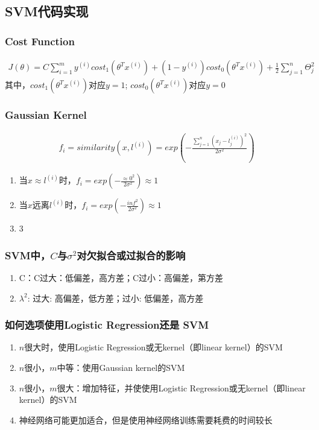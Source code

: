 \subsection{SVM代码实现}
\subsubsection{Cost Function}
\begin{equation}\begin{aligned}
	J(\theta) = C\sum_{i=1}^m y^{(i)}cost_1(\theta^Tx^{(i)}) + (1-y^{(i)})cost_0(\theta^Tx^{(i)}) + \frac{1}{2}\sum_{j=1}^n\Theta_j^2
\end{aligned}\end{equation}
其中，$cost_1(\theta^Tx^{(i)})$对应$y=1$; $cost_0(\theta^Tx^{(i)})$对应$y=0$


\subsubsection{Gaussian Kernel}
\begin{equation}\begin{aligned}
	f_i = similarity(x, l^{(i)}) = exp(-\frac{\sum_{j=1}^n(x_j - l_j^{(i)})^2}{2\sigma^2})
\end{aligned}\end{equation}
\begin{enumerate}
	\item 当$x \approx l^{(i)}$时，$f_i=exp(-\frac{\approx 0^2}{2\sigma^2}) \approx 1$
	\item 当$x$远离$l^{(i)}$时，$f_i=exp(-\frac{inf^2}{2\sigma^2}) \approx 1$
	\item 3
\end{enumerate}


\subsubsection{SVM中，$C$与$\sigma^2$对欠拟合或过拟合的影响}
\begin{enumerate}
	\item C：C过大：低偏差，高方差；C过小：高偏差，第方差
	\item $\lambda^2$: 过大: 高偏差，低方差；过小: 低偏差，高方差
\end{enumerate}


\subsubsection{如何选项使用Logistic Regression还是 SVM}
\begin{enumerate}
	\item $n$很大时，使用Logistic Regression或无kernel（即linear kernel）的SVM
	\item $n$很小，$m$中等：使用Gaussian kernel的SVM
	\item $n$很小，$m$很大：增加特征，并使使用Logistic Regression或无kernel（即linear kernel）的SVM
	\item 神经网络可能更加适合，但是使用神经网络训练需要耗费的时间较长
\end{enumerate}
